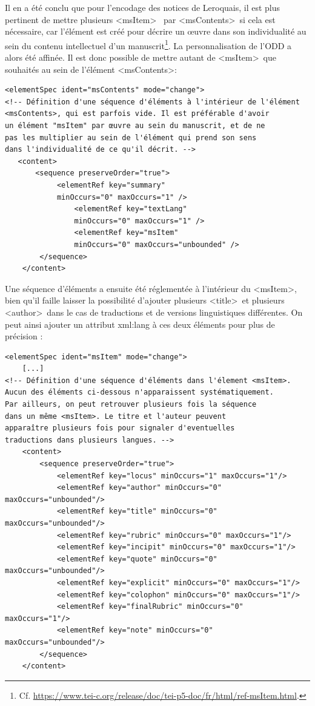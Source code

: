 \documentclass[a4paper,12pt,twoside]{book}
\begin{document}
Il en a été conclu que pour l'encodage des notices de Leroquais, il est plus pertinent de mettre plusieurs \textless msItem\textgreater~ par \textless msContents\textgreater~si cela est nécessaire, car l’élément est créé pour décrire un œuvre dans son individualité au sein du contenu intellectuel d’un manuscrit\footnote{Cf. \url{https://www.tei-c.org/release/doc/tei-p5-doc/fr/html/ref-msItem.html}.}. La personnalisation de l'ODD a alors été affinée. Il est donc possible de mettre autant de \textless msItem\textgreater~que souhaités au sein de l'élément \textless msContents\textgreater :
\begin{verbatim}
<elementSpec ident="msContents" mode="change">
<!-- Définition d'une séquence d'éléments à l'intérieur de l'élément 
<msContents>, qui est parfois vide. Il est préférable d'avoir 
un élément "msItem" par œuvre au sein du manuscrit, et de ne 
pas les multiplier au sein de l'élément qui prend son sens 
dans l'individualité de ce qu'il décrit. -->
   <content>
       <sequence preserveOrder="true">
            <elementRef key="summary" 
            minOccurs="0" maxOccurs="1" />
                <elementRef key="textLang" 
                minOccurs="0" maxOccurs="1" />
                <elementRef key="msItem" 
                minOccurs="0" maxOccurs="unbounded" />            
        </sequence>
    </content>
\end{verbatim}
Une séquence d'éléments a ensuite été réglementée à l’intérieur du \textless msItem\textgreater, bien qu’il faille laisser la possibilité d'ajouter plusieurs \textless title\textgreater~et plusieurs \textless author\textgreater~dans le cas de traductions et de versions linguistiques différentes. On peut ainsi ajouter un attribut xml:lang à ces deux éléments pour plus de précision :
\begin{verbatim}
<elementSpec ident="msItem" mode="change">
    [...]
<!-- Définition d'une séquence d'éléments dans l'élement <msItem>. 
Aucun des éléments ci-dessous n'apparaissent systématiquement. 
Par ailleurs, on peut retrouver plusieurs fois la séquence 
dans un même <msItem>. Le titre et l'auteur peuvent 
apparaître plusieurs fois pour signaler d'eventuelles 
traductions dans plusieurs langues. -->
    <content>
        <sequence preserveOrder="true">
            <elementRef key="locus" minOccurs="1" maxOccurs="1"/>
            <elementRef key="author" minOccurs="0" maxOccurs="unbounded"/>
            <elementRef key="title" minOccurs="0" maxOccurs="unbounded"/>
            <elementRef key="rubric" minOccurs="0" maxOccurs="1"/>
            <elementRef key="incipit" minOccurs="0" maxOccurs="1"/>
            <elementRef key="quote" minOccurs="0" maxOccurs="unbounded"/>
            <elementRef key="explicit" minOccurs="0" maxOccurs="1"/>
            <elementRef key="colophon" minOccurs="0" maxOccurs="1"/>
            <elementRef key="finalRubric" minOccurs="0" maxOccurs="1"/>
            <elementRef key="note" minOccurs="0" maxOccurs="unbounded"/>
        </sequence>
    </content>
\end{verbatim}
\end{document}
